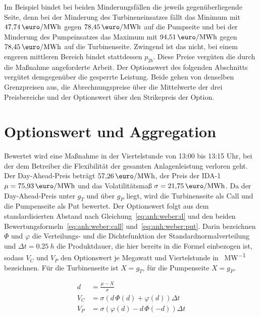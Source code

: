 Im Beispiel bindet bei beiden Minderungsfällen die jeweils gegenüberliegende Seite, denn bei der Minderung des Turbineneinsatzes fällt das Minimum mit $47{,}74\,\si{\text{\euro}\per MWh}$ gegen $78{,}45\,\si{\text{\euro}\per MWh}$ auf die Pumpseite und bei der Minderung des Pumpeinsatzes das Maximum mit $94{,}51\,\si{\text{\euro}\per MWh}$ gegen $78{,}45\,\si{\text{\euro}\per MWh}$ auf die Turbinenseite. Zwingend ist das nicht, bei einem engeren mittleren Bereich bindet stattdessen $p_{2b}$. Diese Preise vergüten die durch die Maßnahme angeforderte Arbeit. Der Optionswert des folgenden Abschnitts vergütet demgegenüber die gesperrte Leistung. Beide gehen von denselben Grenzpreisen aus, die Abrechnungspreise über die Mittelwerte der drei Preisbereiche und der Optionswert über den Strikepreis der Option.

\section{Optionswert und Aggregation}
\label{anh:weber:option}

Bewertet wird eine Maßnahme in der Viertelstunde von 13:00 bis 13:15 Uhr, bei der dem Betreiber die Flexibilität der gesamten Anlagenleistung verloren geht. Der Day-Ahead-Preis beträgt $57{,}26\,\si{\text{\euro}\per MWh}$, der Preis der \ac{IDA-1} $\mu = 75{,}93\,\si{\text{\euro}\per MWh}$ und das Volatilitätsmaß $\sigma = 21{,}75\,\si{\text{\euro}\per MWh}$. Da der Day-Ahead-Preis unter $g_T$ und über $g_P$ liegt, wird die Turbinenseite als Call und die Pumpenseite als Put bewertet. Der Optionswert folgt aus dem standardisierten Abstand nach Gleichung~\eqref{eq:anh:weber:d} und den beiden Bewertungsformeln~\eqref{eq:anh:weber:call} und~\eqref{eq:anh:weber:put}. Darin bezeichnen $\Phi$ und $\varphi$ die Verteilungs- und die Dichtefunktion der Standardnormalverteilung und $\Delta t = \SI{0,25}{h}$ die Produktdauer, die hier bereits in die Formel einbezogen ist, sodass $V_C$ und $V_P$ den Optionswert je Megawatt und Viertelstunde in \si{\text{\euro}\per MW} bezeichnen. Für die Turbinenseite ist $X = g_T$, für die Pumpenseite $X = g_P$.

\begin{align}
  d &= \frac{\mu - X}{\sigma} \label{eq:anh:weber:d}\\
  V_C &= \sigma \left( d\,\Phi(d) + \varphi(d) \right) \Delta t \label{eq:anh:weber:call}\\
  V_P &= \sigma \left( \varphi(d) - d\,\Phi(-d) \right) \Delta t \label{eq:anh:weber:put}
\end{align}

